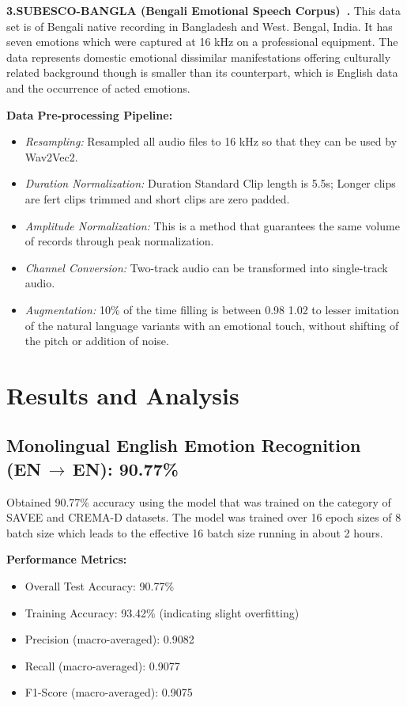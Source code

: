 \documentclass[conference]{IEEEtran}
\begin{document}
\smallskip
\noindent\textbf{3.\enspace SUBESCO-BANGLA (Bengali Emotional Speech Corpus)~\cite{rahman2019}.}
This data set is of Bengali native recording in Bangladesh and West.
Bengal, India. It has seven emotions which were captured at 16 kHz on a professional equipment. The data represents domestic emotional dissimilar manifestations offering culturally related background though is smaller than its counterpart, which is English data and the occurrence of acted emotions.

\smallskip
\noindent\textbf{Data Pre-processing Pipeline:}
\begin{itemize}
  \item \textit{Resampling:} Resampled all audio files to 16 kHz so that they can be used by Wav2Vec2.
  \item \textit{Duration Normalization:} Duration Standard Clip length is 5.5s; Longer clips are fert clips trimmed and short clips are zero padded.
  \item \textit{Amplitude Normalization:} This is a method that guarantees the same volume of records through peak normalization.
  \item \textit{Channel Conversion:} Two-track audio can be transformed into single-track audio.
  \item \textit{Augmentation:} 10\% of the time filling is between 0.98 1.02 to lesser imitation of the natural language variants with an emotional touch, without shifting of the pitch or addition of noise.
\end{itemize}

\section{Results and Analysis}
\subsection{Monolingual English Emotion Recognition
  (EN\,$\rightarrow$\,EN): 90.77\%}
Obtained 90.77\% accuracy using the model that was trained on the category of SAVEE and CREMA-D datasets. The model was trained over 16 epoch sizes of 8 batch size which leads to the effective 16 batch size running in about 2 hours.

\noindent\textbf{Performance Metrics:}
\begin{itemize}
  \item Overall Test Accuracy: 90.77\%
  \item Training Accuracy: 93.42\% (indicating slight overfitting)
  \item Precision (macro-averaged): 0.9082
  \item Recall (macro-averaged): 0.9077
  \item F1-Score (macro-averaged): 0.9075
\end{itemize}
\end{document}
